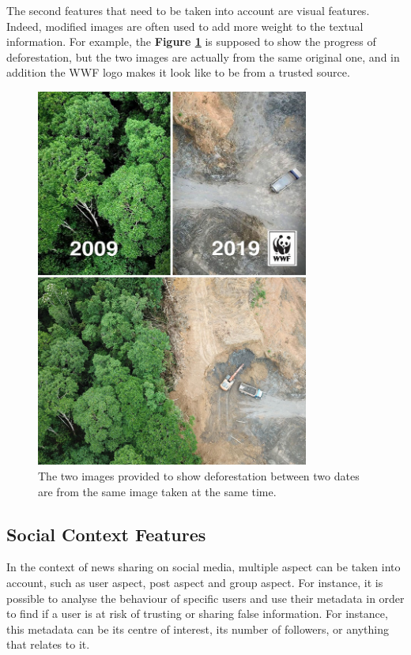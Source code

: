 The second features that need to be taken into account are visual features. Indeed, modified images are often used to add more weight to the textual information. For example, the \textbf{Figure \ref{fig:intro:deforestation}} is supposed to show the progress of deforestation, but the two images are actually from the same original one, and in addition the WWF logo makes it look like to be from a trusted source. 
\begin{figure}
 \centering
 \includegraphics[width=0.8\textwidth]{images/introduction/fake-news-photos-viral-photoshop-8-5c6fe61f88240__700}
 \caption{The two images provided to show deforestation between two dates are from the same image taken at the same time. \cite{WWF2019}}
 \label{fig:intro:deforestation}
\end{figure}
\subsection{Social Context Features}
In the context of news sharing on social media, multiple aspect can be taken into account, such as user aspect, post aspect and group aspect. For instance, it is possible to analyse the behaviour of specific users and use their metadata in order to find if a user is at risk of trusting or sharing false information. For instance, this metadata can be its centre of interest, its number of followers, or anything that relates to it. \\

